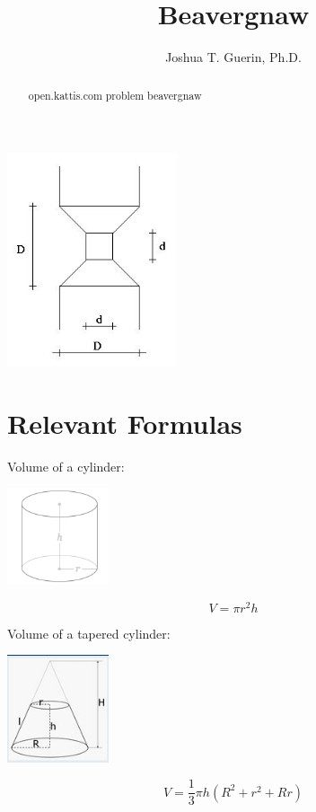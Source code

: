 \documentclass{article}
\begin{document}
  \title{Beavergnaw}
  \author{Joshua T. Guerin, Ph.D.}
  
  \maketitle
  
  \begin{abstract}
    open.kattis.com problem beavergnaw\\
  \end{abstract}
  
  \begin{center}
    \includegraphics[width=5cm]{./images/diagram}
  \end{center}

  \section*{Relevant Formulas}
  Volume of a cylinder:
  \begin{center}
    \includegraphics[width=3cm]{./images/cylinder}
  \end{center}
  \[V = \pi{}r^2h\]

  Volume of a tapered cylinder:
  \begin{center}
    \includegraphics[width=3cm]{./images/tapered}
  \end{center}
  \[V = \dfrac{1}{3}\pi{}h(R^2 + r^2 + Rr)\]
\end{document}
